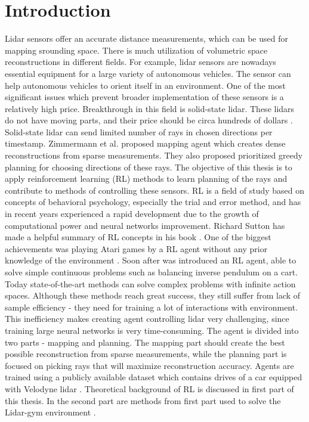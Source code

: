 \section{Introduction}

Lidar sensors offer an accurate distance measurements, which can be used for mapping srounding space. There is much utilization of volumetric space reconstructions in different fields. For example, lidar sensors are nowadays essential equipment for a large variety of autonomous vehicles. The sensor can help autonomous vehicles to orient itself in an environment. One of the most significant issues which prevent broader implementation of these sensors is a relatively high price. Breakthrough in this field is solid-state lidar. These lidars do not have moving parts, and their price should be circa hundreds of dollars \cite{quanergy2016}. Solid-state lidar can send limited number of rays in chosen directions per timestamp. Zimmermann et al. \cite{zimmermann2017} proposed mapping agent which creates dense reconstructions from sparse measurements. They also proposed prioritized greedy planning for choosing directions of these rays. The objective of this thesis is to apply reinforcement learning (RL) methods to learn planning of the rays and contribute to methods of controlling these sensors. RL is a field of study based on concepts of behavioral psychology, especially the trial and error method, and has in recent years experienced a rapid development due to the growth of computational power and neural networks improvement. Richard Sutton has made a helpful summary of RL concepts in his book \cite{sutton2012}. One of the biggest achievements was playing Atari games by a RL agent without any prior knowledge of the environment \cite{mnih2015}. Soon after was introduced an RL agent, able to solve simple continuous problems such as balancing inverse pendulum on a cart. Today state-of-the-art methods can solve complex problems with infinite action spaces. Although these methods reach great success, they still suffer from lack of sample efficiency - they need for training a lot of interactions with environment. This inefficiency makes creating agent controlling lidar very challenging, since training large neural networks is very time-consuming. The agent is divided into two parts - mapping and planning. The mapping part should create the best possible reconstruction from sparse measurements, while the planning part is focused on picking rays that will maximize reconstruction accuracy. Agents are trained using a publicly available dataset which contains drives of a car equipped with Velodyne lidar \cite{geiger2013}. Theoretical background of RL is discussed in first part of this thesis. In the second part are methods from first part used to solve the Lidar-gym environment \cite{rozsypalek2018}.
  